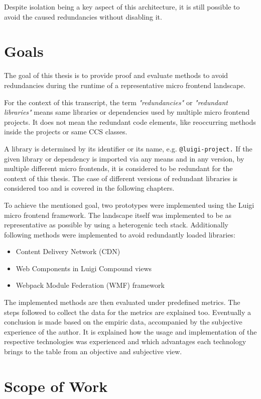 Despite isolation being a key aspect of this architecture, it is still possible to avoid the caused redundancies without disabling it.

\section{Goals}

The goal of this thesis is to provide proof and evaluate methods to avoid redundancies during the runtime of a representative micro frontend landscape. 

For the context of this transcript, the term \textit{"redundancies"} or \textit{"redundant libraries"} means same libraries or dependencies used by multiple micro frontend projects. It does not mean the redundant code elements, like reoccurring methods inside the projects or same CCS classes. 

A library is determined by its identifier or its name, e.g. \texttt{@luigi-project.} If the given library or dependency is imported via any means and in any version, by multiple different micro frontends, it is considered to be redundant for the context of this thesis. The case of different versions of redundant libraries is considered too and is covered in the following chapters.

To achieve the mentioned goal, two prototypes were implemented using the Luigi micro frontend framework. The landscape itself was implemented to be as representative as possible by using a heterogenic tech stack. Additionally following methods were implemented to avoid redundantly loaded libraries:

\begin{itemize}
	\item Content Delivery Network (CDN)
	\item Web Components in Luigi Compound views
	\item Webpack Module Federation (WMF) framework
\end{itemize}

The implemented methods are then evaluated under predefined metrics. The steps followed to collect the data for the metrics are explained too.
Eventually a conclusion is made based on the empiric data, accompanied by the subjective experience of the author. It is explained how the usage and implementation of the respective technologies was experienced and which advantages each technology brings to the table from an objective and subjective view.
  
\section{Scope of Work}

